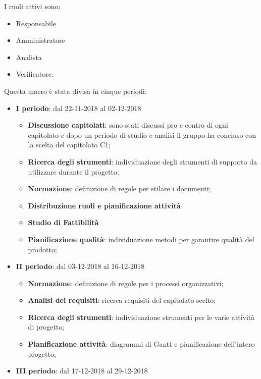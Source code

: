         I ruoli attivi sono: 
        \begin{itemize}
            \item Responsabile
            \item Amministratore
            \item Analista
            \item Verificatore.
        \end{itemize}
        Questa macro è stata divisa in cinque periodi:
		\begin{itemize}
			\item \textbf{I periodo}: dal 22-11-2018 al 02-12-2018
			\begin{itemize}
    	        \item \textbf{Discussione capitolati}: sono stati discussi pro e contro di ogni capitolato e dopo un periodo di
    	        studio e analisi il gruppo ha concluso con la scelta del capitolato C1;
    	        \item \textbf{Ricerca degli strumenti}: individuazione degli strumenti di supporto da utilizzare durante il progetto;
    	        \item \textbf{Normazione}: definizione di regole per stilare i documenti;
    	        \item \textbf{Distribuzione ruoli e pianificazione attività}
       	        \item \textbf{Studio di Fattibilità}
       	        \item \textbf{Pianificazione qualità}: individuazione metodi per garantire qualità del prodotto;
        	\end{itemize}
			\item \textbf{II periodo}: dal 03-12-2018 al 16-12-2018
			\begin{itemize}
    	        \item \textbf{Normazione}: definizione di regole per i processi organizzativi;
    	        \item \textbf{Analisi dei requisiti}: ricerca requisiti del capitolato scelto;
       	        \item \textbf{Ricerca degli strumenti}: individuazione strumenti per le varie attività di progetto;
       	        \item \textbf{Pianificazione attività}: diagrammi di Gantt e pianificazione dell'intero progetto;
        	\end{itemize}
        	\item \textbf{III periodo}: dal 17-12-2018 al 29-12-2018
			\begin{itemize}

\end{itemize}
\end{itemize}
